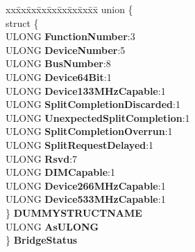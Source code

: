 \begin{DoxyCompactItemize}
\begin{tabbing}
\end{tabbing}\item 
\mbox{\label{struct___p_c_i_x___b_r_i_d_g_e___c_a_p_a_b_i_l_i_t_y_a727fc2d7441ed6657a91ff482005207e}} 
\begin{tabbing}
xx\=xx\=xx\=xx\=xx\=xx\=xx\=xx\=xx\=\kill
union \{\\
\>struct \{\\
\>\>ULONG {\bfseries FunctionNumber}:3\\
\>\>ULONG {\bfseries DeviceNumber}:5\\
\>\>ULONG {\bfseries BusNumber}:8\\
\>\>ULONG {\bfseries Device64Bit}:1\\
\>\>ULONG {\bfseries Device133MHzCapable}:1\\
\>\>ULONG {\bfseries SplitCompletionDiscarded}:1\\
\>\>ULONG {\bfseries UnexpectedSplitCompletion}:1\\
\>\>ULONG {\bfseries SplitCompletionOverrun}:1\\
\>\>ULONG {\bfseries SplitRequestDelayed}:1\\
\>\>ULONG {\bfseries Rsvd}:7\\
\>\>ULONG {\bfseries DIMCapable}:1\\
\>\>ULONG {\bfseries Device266MHzCapable}:1\\
\>\>ULONG {\bfseries Device533MHzCapable}:1\\
\>\} {\bfseries DUMMYSTRUCTNAME}\\
\>ULONG {\bfseries AsULONG}\\
\} {\bfseries BridgeStatus}\\


\end{tabbing}
\end{DoxyCompactItemize}
